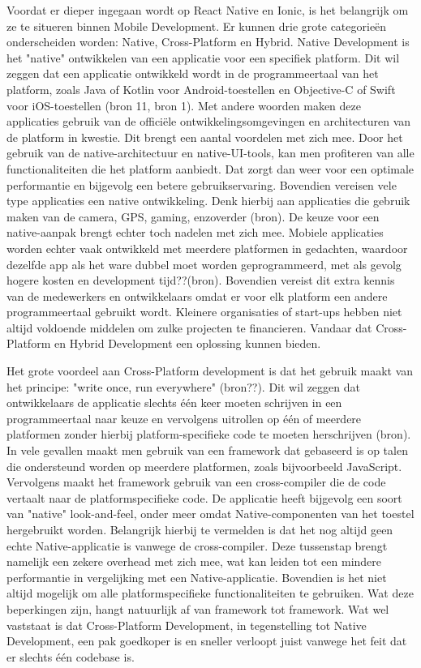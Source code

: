 Voordat er dieper ingegaan wordt op React Native en Ionic, is het belangrijk om ze te situeren binnen Mobile Development. Er kunnen drie grote categorieën onderscheiden worden: Native, Cross-Platform en Hybrid. Native Development is het "native" ontwikkelen van een applicatie voor een specifiek platform. Dit wil zeggen dat een applicatie ontwikkeld wordt in de programmeertaal van het platform, zoals Java of Kotlin voor Android-toestellen en Objective-C of Swift voor iOS-toestellen (bron 11, bron 1). Met andere woorden maken deze applicaties gebruik van de officiële ontwikkelingsomgevingen en architecturen van de platform in kwestie. Dit brengt een aantal voordelen met zich mee. Door het gebruik van de native-architectuur en native-UI-tools, kan men profiteren van alle functionaliteiten die het platform aanbiedt. Dat zorgt dan weer voor een optimale performantie en bijgevolg een betere gebruikservaring. Bovendien vereisen vele type applicaties een native ontwikkeling. Denk hierbij aan applicaties die gebruik maken van de camera, GPS, gaming, enzoverder (bron). De keuze voor een native-aanpak brengt echter toch nadelen met zich mee. Mobiele applicaties worden echter vaak ontwikkeld met meerdere platformen in gedachten, waardoor dezelfde app als het ware dubbel moet worden geprogrammeerd, met als gevolg hogere kosten en development tijd??(bron). Bovendien vereist dit extra kennis van de medewerkers en ontwikkelaars omdat er voor elk platform een andere programmeertaal gebruikt wordt. Kleinere organisaties of start-ups hebben niet altijd voldoende middelen om zulke projecten te financieren. Vandaar dat Cross-Platform en Hybrid Development een oplossing kunnen bieden.

Het grote voordeel aan Cross-Platform development is dat het gebruik maakt van het principe: "write once, run everywhere" (bron??). Dit wil zeggen dat ontwikkelaars de applicatie slechts één keer moeten schrijven in een programmeertaal naar keuze en vervolgens uitrollen op één of meerdere platformen zonder hierbij platform-specifieke code te moeten herschrijven (bron). In vele gevallen maakt men gebruik van een framework dat gebaseerd is op talen die ondersteund worden op meerdere platformen, zoals bijvoorbeeld JavaScript. Vervolgens maakt het framework gebruik van een cross-compiler die de code vertaalt naar de platformspecifieke code. De applicatie heeft bijgevolg een soort van "native" look-and-feel, onder meer omdat Native-componenten van het toestel hergebruikt worden. Belangrijk hierbij te vermelden is dat het nog altijd geen echte Native-applicatie is vanwege de cross-compiler. Deze tussenstap brengt namelijk een zekere overhead met zich mee, wat kan leiden tot een mindere performantie in vergelijking met een Native-applicatie. Bovendien is het niet altijd mogelijk om alle platformspecifieke functionaliteiten te gebruiken. Wat deze beperkingen zijn, hangt natuurlijk af van framework tot framework. Wat wel vaststaat is dat Cross-Platform Development, in tegenstelling tot Native Development, een pak goedkoper is en sneller verloopt juist vanwege het feit dat er slechts één codebase is.

